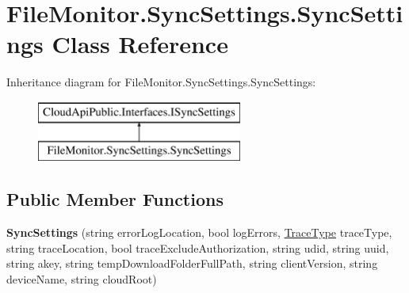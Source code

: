 \hypertarget{class_file_monitor_1_1_sync_settings_1_1_sync_settings}{\section{File\-Monitor.\-Sync\-Settings.\-Sync\-Settings Class Reference}
\label{class_file_monitor_1_1_sync_settings_1_1_sync_settings}
}
Inheritance diagram for File\-Monitor.\-Sync\-Settings.\-Sync\-Settings\-:\begin{figure}[H]
\begin{center}
\leavevmode
\includegraphics[height=2.000000cm]{class_file_monitor_1_1_sync_settings_1_1_sync_settings}
\end{center}
\end{figure}
\subsection*{Public Member Functions}
\begin{DoxyCompactItemize}
\item 
\hypertarget{class_file_monitor_1_1_sync_settings_1_1_sync_settings_a2a4bf58bad5a9849d62e26cc7237629e}{{\bfseries Sync\-Settings} (string error\-Log\-Location, bool log\-Errors, \hyperlink{namespace_cloud_api_public_1_1_static_a7e5ae8f2a85f427de3d6c8a5afcbb029}{Trace\-Type} trace\-Type, string trace\-Location, bool trace\-Exclude\-Authorization, string udid, string uuid, string akey, string temp\-Download\-Folder\-Full\-Path, string client\-Version, string device\-Name, string cloud\-Root)}\label{class_file_monitor_1_1_sync_settings_1_1_sync_settings_a2a4bf58bad5a9849d62e26cc7237629e}

\end{DoxyCompactItemize}
